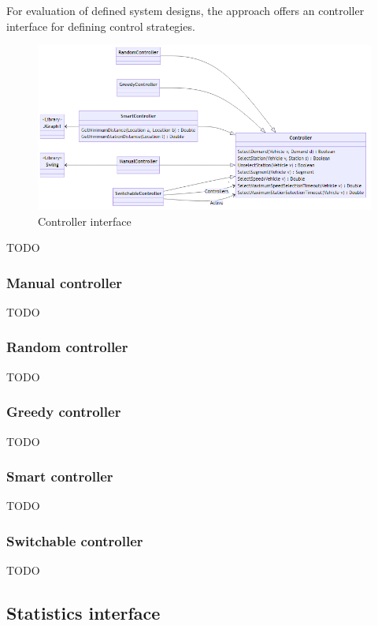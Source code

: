 \documentclass[10pt,twocolumn]{article}
\begin{document}
For evaluation of defined system designs, the approach offers an controller interface for defining control strategies. 

\begin{figure}[tbp]
    \includegraphics[width=\textwidth]{../../diagrams/controller/classes.png}
    \caption{Controller interface}
    \label{fig:controller-interface}
\end{figure}

TODO

\subsubsection{Manual controller}

TODO

\subsubsection{Random controller}

TODO

\subsubsection{Greedy controller}

TODO

\subsubsection{Smart controller}

TODO

\subsubsection{Switchable controller}

TODO

\subsection{Statistics interface}
\label{sec:statistics-interface}
\end{document}
